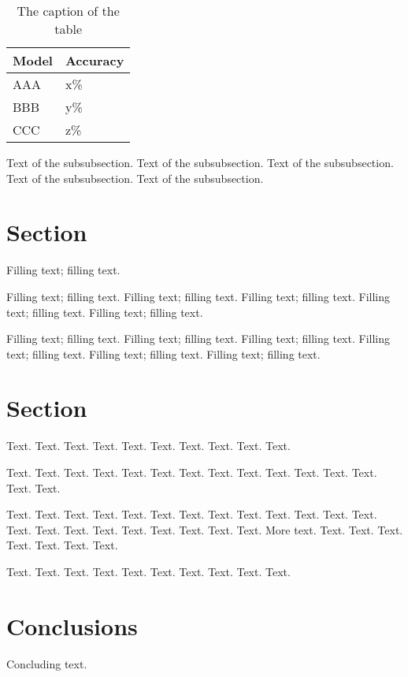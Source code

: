 \documentclass[11pt,twocolumn]{article}
\begin{document}
\begin{table}[h]
 \begin{center}
\begin{tabular}{|l|l|}

      \hline
      \textbf{Model} & \textbf{Accuracy}\\
      \hline%
      AAA & x\%\\
      BBB & y\%\\
      CCC & z\%\\
      \hline

\end{tabular}
\caption{The caption of the table}\label{table1}
 \end{center}
\end{table}


Text of the subsubsection.
Text of the subsubsection.
Text of the subsubsection.
Text of the subsubsection.
Text of the subsubsection.


\section{Section}

Filling text; filling text.

Filling text; filling text.
Filling text; filling text.
Filling text; filling text.
Filling text; filling text.
Filling text; filling text.

Filling text; filling text.
Filling text; filling text.
Filling text; filling text.
Filling text; filling text.
Filling text; filling text.
Filling text; filling text.

\section{Section}

Text. Text. Text. Text. Text.
Text. Text. Text. Text. Text.

Text. Text. Text. Text. Text.
Text. Text. Text. Text. Text.
Text. Text. Text. Text. Text.

Text. Text. Text. Text. Text.
Text. Text. Text. Text. Text.
Text. Text. Text. Text. Text.
Text. Text. Text. Text. Text.
Text. Text. More text. Text. Text.
Text. Text. Text. Text. Text.

Text. Text. Text. Text. Text.
Text. Text. Text. Text. Text.

\section{Conclusions}

Concluding text.



\end{document}
